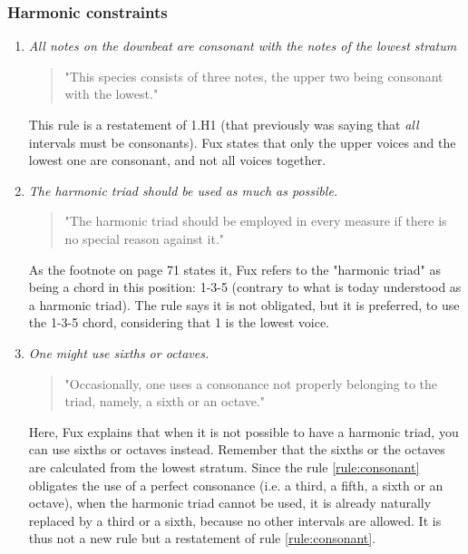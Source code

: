 \subsubsection{Harmonic constraints}
\begin{enumerate}[wide, label=\bfseries 1.H\arabic*]
    \item\label{rule:consonant} \textit{All notes on the downbeat are consonant with the notes of the lowest stratum}
     
    \begin{quotation}
       "This species consists of three notes, the upper two being consonant with the lowest."
       \textcite[p.71]{GaPEng}
   \end{quotation}

   This rule is a restatement of 1.H1 (that previously was saying that \textit{all} intervals must be consonants). Fux states that only the upper voices and the lowest one are consonant, and not all voices together. 
    
    \setcounter{enumi}{7} %

    \item\label{rule:harmonic-triad} \reddot \textit{The harmonic triad should be used as much as possible.}

    \begin{quotation}
    "The harmonic triad should be employed in every measure if there is no special reason against it."
    \textcite[p.71]{GaPEng}
    \end{quotation}

    As the footnote on page 71 states it, Fux refers to the "harmonic triad" as being a chord in this position: 1-3-5 (contrary to what is today understood as a harmonic triad).
    The rule says it is not obligated, but it is preferred, to use the 1-3-5 chord, considering that 1 is the lowest voice.
    

    \item\label{rule:sixth-or-octaves} \reddot \textit{One might use sixths or octaves.}

    \begin{quotation}
    "Occasionally, one uses a consonance not properly belonging to the triad, namely, a sixth or an octave."
    \textcite[p.72]{GaPEng}
    \end{quotation}

    Here, Fux explains that when it is not possible to have a harmonic triad, you can use sixths or octaves instead. Remember that the sixths or the octaves are calculated from the lowest stratum. Since the rule \ref{rule:consonant} obligates the use of a perfect consonance (i.e. a third, a fifth, a sixth or an octave), when the harmonic triad cannot be used, it is already naturally replaced by a third or a sixth, because no other intervals are allowed. It is thus not a new rule but a restatement of rule \ref{rule:consonant}.    


\end{enumerate}
